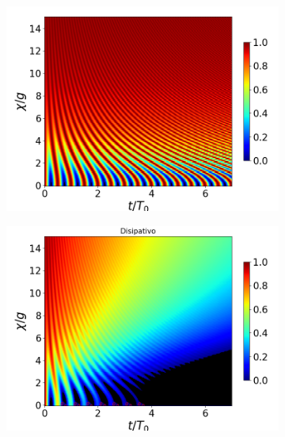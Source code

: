\begin{figure}[h!]
    \centering
    \begin{subfigure}{0.49\textwidth}
        \includegraphics[width=\textwidth]{figuras/ch4/concu/chi/eg0+ge0 d=0.0g k=0.0g J=0.0g gamma=0.25g concu chi uni.png}
        \caption{}
        \label{fig4:concu x 0 uni}
    \end{subfigure}
    \hfill
    \begin{subfigure}{0.49\textwidth}
        \includegraphics[width=\textwidth]{figuras/ch4/concu/chi/eg0+ge0 d=0.0g k=0.0g J=0.0g gamma=0.25g concu chi dis.png}
        \caption{}
        \label{fig4:concu x 0 dis}
    \end{subfigure}
    \vfill
    \begin{subfigure}{0.49\textwidth}

\end{subfigure}
\end{figure}
